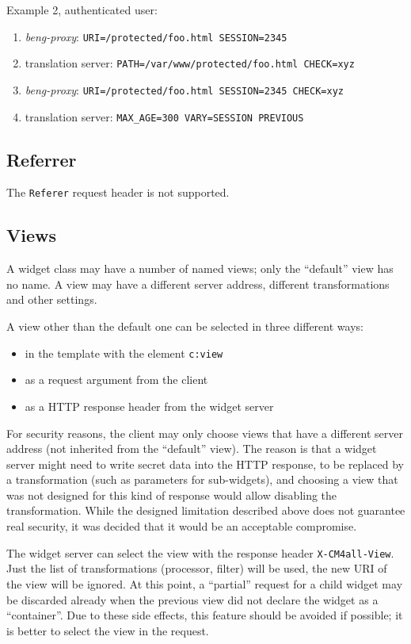 \documentclass[a4paper,12pt]{article}
\begin{document}
Example 2, authenticated user:

\begin{enumerate}
\item \emph{beng-proxy}: \texttt{URI=/protected/foo.html SESSION=2345}
\item translation server: \texttt{PATH=/var/www/protected/foo.html
  CHECK=xyz}
\item \emph{beng-proxy}: \texttt{URI=/protected/foo.html SESSION=2345
  CHECK=xyz}
\item translation server: \texttt{MAX\_AGE=300 VARY=SESSION PREVIOUS}
\end{enumerate}


\subsection{Referrer}

The \texttt{Referer} request header is not supported.

\subsection{Views}

A widget class may have a number of named views; only the ``default''
view has no name.  A view may have a different server address,
different transformations and other settings.

A view other than the default one can be selected in three different
ways:

\begin{itemize}
\item in the template with the element \texttt{c:view}
\item as a request argument from the client
\item as a HTTP response header from the widget server
\end{itemize}

For security reasons, the client may only choose views that have a
different server address (not inherited from the ``default'' view).
The reason is that a widget server might need to write secret data
into the HTTP response, to be replaced by a transformation (such as
parameters for sub-widgets), and choosing a view that was not designed
for this kind of response would allow disabling the transformation.
While the designed limitation described above does not guarantee real
security, it was decided that it would be an acceptable compromise.

The widget server can select the view with the response header
\texttt{X-CM4all-View}.  Just the list of transformations (processor,
filter) will be used, the new URI of the view will be ignored.  At
this point, a ``partial'' request for a child widget may be discarded
already when the previous view did not declare the widget as a
``container''.  Due to these side effects, this feature should be
avoided if possible; it is better to select the view in the request.
\end{document}
